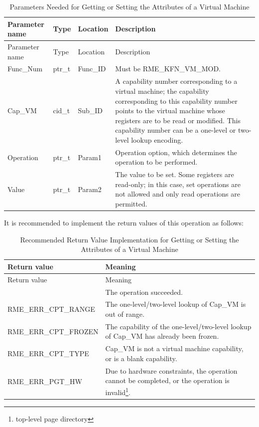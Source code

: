 \begin{xltabular}{\textwidth}{@{}>{\hsize\raggedright\arraybackslash}X>{\hsize\raggedright\arraybackslash}X>{\hsize\raggedright\arraybackslash}X>{\hsize\raggedright\arraybackslash}X@{}}
\caption{Parameters Needed for Getting or Setting the Attributes of a Virtual Machine}\label{tab:8-79-get-or-set-virtual-machine-attributes-parameters}\\
\toprule
Parameter name & Type & Location & Description\tabularnewline
\endfirsthead
\toprule
Parameter name & Type & Location & Description\tabularnewline
\midrule
\endhead
\bottomrule
\endlastfoot
Func\_Num & ptr\_t & Func\_ID & Must be RME\_KFN\_VM\_MOD.\tabularnewline
Cap\_VM & cid\_t & Sub\_ID &
A capability number corresponding to a virtual machine; the capability corresponding to this capability number points to the virtual machine whose registers are to be read or modified. This capability number can be a one-level or two-level lookup encoding.\tabularnewline
Operation & ptr\_t & Param1 &
Operation option, which determines the operation to be performed.\tabularnewline
Value & ptr\_t & Param2 &
The value to be set. Some registers are read-only; in this case, set operations are not allowed and only read operations are permitted.\tabularnewline
\end{xltabular}
\nopagebreak[4]

It is recommended to implement the return values of this operation as follows:

\begin{xltabular}{\textwidth}{@{}>{\hsize\raggedright\arraybackslash}X>{\hsize\raggedright\arraybackslash}X@{}}
\caption{Recommended Return Value Implementation for Getting or Setting the Attributes of a Virtual Machine}\label{tab:8-80-get-or-set-virtual-machine-attributes-suggested-return-values}\\
\toprule
Return value & Meaning\tabularnewline
\endfirsthead
\toprule
Return value & Meaning\tabularnewline
\midrule
\endhead
\bottomrule
{} & The operation succeeded.\tabularnewline
    RME\_ERR\_CPT\_RANGE & The one-level/two-level lookup of Cap\_VM is out of range.\tabularnewline
    RME\_ERR\_CPT\_FROZEN & The capability of the one-level/two-level lookup of Cap\_VM has already been frozen.\tabularnewline
    RME\_ERR\_CPT\_TYPE & Cap\_VM is not a virtual machine capability, or is a blank capability.\tabularnewline
    RME\_ERR\_PGT\_HW & Due to hardware constraints, the operation cannot be completed, or the operation is invalid\footnote{top-level page directory}.\tabularnewline
\end{xltabular}
\nopagebreak[4]

